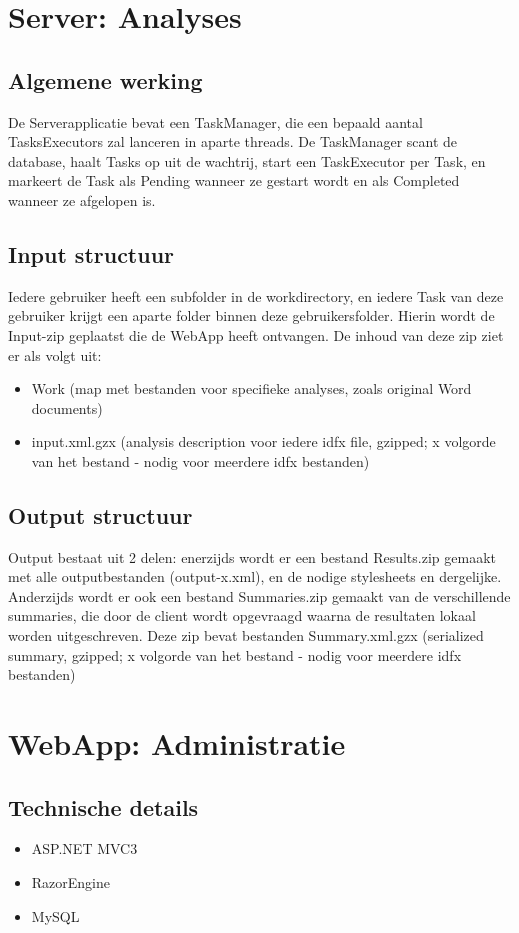 \documentclass[a4paper,11pt]{report}
\begin{document}
\section{Server: Analyses}
\subsection{Algemene werking}
De Serverapplicatie bevat een TaskManager, die een bepaald aantal TasksExecutors zal lanceren in aparte threads. De TaskManager scant de database, haalt Tasks op uit de wachtrij, start een TaskExecutor per Task, en markeert de Task als Pending wanneer ze gestart wordt en als Completed wanneer ze afgelopen is.
\subsection{Input structuur}
Iedere gebruiker heeft een subfolder in de workdirectory, en iedere Task van deze gebruiker krijgt een aparte folder binnen deze gebruikersfolder.
Hierin wordt de Input-zip geplaatst die de WebApp heeft ontvangen.
De inhoud van deze zip ziet er als volgt uit:
\begin{itemize}
\item[-] Work (map met bestanden voor specifieke analyses, zoals original Word documents)
\item[-] input.xml.gzx (analysis description voor iedere idfx file, gzipped; x volgorde van het bestand - nodig voor meerdere idfx bestanden)
\end{itemize}
\subsection{Output structuur}
Output bestaat uit 2 delen: enerzijds wordt er een bestand Results.zip gemaakt met alle outputbestanden (output-x.xml), en de nodige stylesheets en dergelijke. Anderzijds wordt er ook een bestand Summaries.zip gemaakt van de verschillende summaries, die door de client wordt opgevraagd waarna de resultaten lokaal worden uitgeschreven. Deze zip bevat bestanden Summary.xml.gzx (serialized summary, gzipped; x volgorde van het bestand - nodig voor meerdere idfx bestanden)
	
\section{WebApp: Administratie}
\subsection{Technische details}
	\begin{itemize}
		\item ASP.NET MVC3
		\item RazorEngine
		\item MySQL
	\end{itemize}
\end{document}
